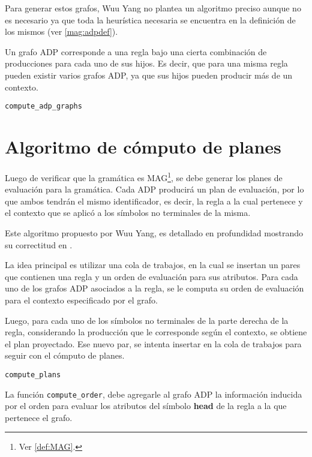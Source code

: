 Para generar estos grafos, Wuu Yang no plantea un algoritmo preciso aunque no es necesario ya que toda la heurística necesaria se encuentra en la definición de los mismos (ver \ref{mag:adpdef}).

Un grafo ADP corresponde a una regla bajo una cierta combinación de producciones para cada uno de sus hijos. Es decir, que para una misma regla pueden existir varios grafos ADP, ya que sus hijos pueden producir más de un contexto.

\begin{algorithm}[H]

\caption{\texttt{compute\_adp\_graphs}}
\end{algorithm}

\section{Algoritmo de cómputo de planes}
\label{sec:comp-planes}
Luego de verificar que la gramática es MAG\footnote{Ver \ref{def:MAG}.}, se debe generar los planes de evaluación para la gramática. Cada ADP producirá un plan de evaluación, por lo que ambos tendrán el mismo identificador, es decir, la regla a la cual pertenece y el contexto que se aplicó a los símbolos no terminales de la misma.

Este algoritmo propuesto por Wuu Yang, es detallado en profundidad mostrando su correctitud en \cite{wuu-yang1}.

La idea principal es utilizar una cola de trabajos, en la cual se insertan un pares que contienen una regla y un orden de evaluación para sus atributos. Para cada uno de los grafos ADP asociados a la regla, se le computa su orden de evaluación para el contexto especificado por el grafo.

Luego, para cada uno de los símbolos no terminales de la parte derecha de la regla, considerando la producción que le corresponde según el contexto, se obtiene el plan proyectado. Ese nuevo par, se intenta insertar en la cola de trabajos para seguir con el cómputo de planes.

\begin{algorithm}[H]

\caption{\texttt{compute\_plans}}
\end{algorithm}

La función \texttt{compute\_order}, debe agregarle al grafo ADP la información inducida por el orden para evaluar los atributos del símbolo \textbf{head} de la regla a la que pertenece el grafo.

